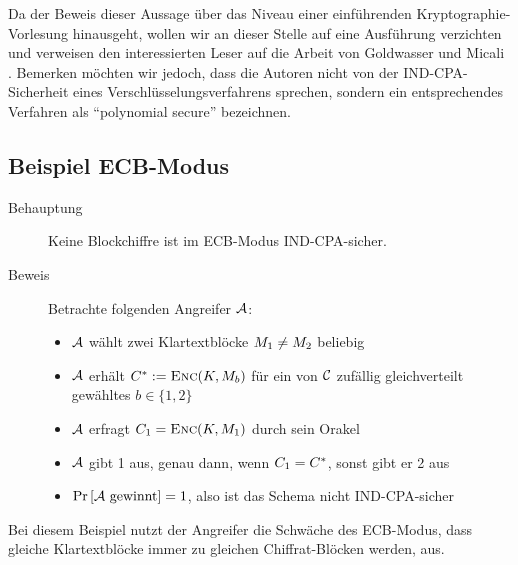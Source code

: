 Da der Beweis dieser Aussage über das Niveau einer einführenden Kryptographie-Vorlesung hinausgeht, wollen wir an dieser Stelle auf eine Ausführung verzichten und verweisen den interessierten Leser auf die Arbeit von Goldwasser und Micali \cite{Goldwasser1984}. Bemerken möchten wir jedoch, dass die Autoren nicht von der IND-CPA-Sicherheit eines Verschlüsselungsverfahrens sprechen, sondern ein entsprechendes Verfahren als "`polynomial secure"' bezeichnen. 

\subsection{Beispiel ECB-Modus}
\begin{description} 
	\item[Behauptung] Keine Blockchiffre ist im ECB-Modus IND-CPA-sicher.
	\item[Beweis] Betrachte folgenden Angreifer $\mathcal{A}$:
	\begin{itemize}
		\item $\mathcal{A}$ wählt zwei Klartextblöcke $M_1 \neq M_2$ beliebig
		\item $\mathcal{A}$ erhält  $C^{*} := \textsc{Enc}(K, M_{b})$ für ein von $\mathcal{C}$ zufällig gleichverteilt gewähltes $b \in \{1, 2\}$
		\item $\mathcal{A}$ erfragt $C_1 = \textsc{Enc}(K, M_1)$ durch sein Orakel
		\item $\mathcal{A}$ gibt 1 aus, genau dann, wenn $C_1 = C^{*}$, sonst gibt er 2 aus
		\item $\Pr \left[ \mathcal{A} \text{ gewinnt} \right] = 1$, also ist das Schema nicht IND-CPA-sicher
	\end{itemize}
\end{description}
Bei diesem Beispiel nutzt der Angreifer die Schwäche des ECB-Modus, dass gleiche Klartextblöcke immer zu gleichen Chiffrat-Blöcken werden, aus.

